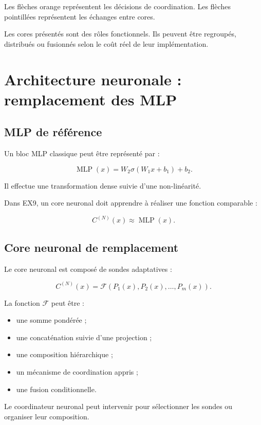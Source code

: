 \documentclass[11pt,a4paper]{article}
\begin{document}
Les flèches orange représentent les décisions de coordination.
Les flèches pointillées représentent les échanges entre cores.

Les cores présentés sont des rôles fonctionnels. Ils peuvent être
regroupés, distribués ou fusionnés selon le coût réel de leur
implémentation.

\section{Architecture neuronale : remplacement des MLP}

\subsection{MLP de référence}

Un bloc MLP classique peut être représenté par :

\[
\operatorname{MLP}(x)
=
W_2\sigma(W_1x+b_1)+b_2.
\]

Il effectue une transformation dense suivie d'une non-linéarité.

Dans EX9, un core neuronal doit apprendre à réaliser une fonction
comparable :

\[
C^{(N)}(x)
\approx
\operatorname{MLP}(x).
\]

\subsection{Core neuronal de remplacement}

Le core neuronal est composé de sondes adaptatives :

\[
C^{(N)}(x)
=
\mathcal{F}
\left(
P_1(x),P_2(x),\ldots,P_m(x)
\right).
\]

La fonction $\mathcal{F}$ peut être :
\begin{itemize}
  \item une somme pondérée ;
  \item une concaténation suivie d'une projection ;
  \item une composition hiérarchique ;
  \item un mécanisme de coordination appris ;
  \item une fusion conditionnelle.
\end{itemize}

Le coordinateur neuronal peut intervenir pour sélectionner
les sondes ou organiser leur composition.
\end{document}

